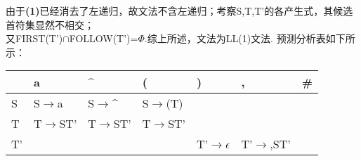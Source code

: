 \documentclass{article}
\begin{document}
由于\textbf{(1)}已经消去了左递归，故文法不含左递归；考察S,T,T'的各产生式，其候选首符集显然不相交；\\
又FIRST(T')$\cap$FOLLOW(T')=$\Phi$.综上所述，文法为LL(1)文法.
预测分析表如下所示：
\begin{table}[h]
    \centering
\begin{tabular}{|p{2cm}<{\centering}|p{2cm}<{\centering}|p{2cm}<{\centering}|p{2cm}<{\centering}|p{2cm}<{\centering}|p{2cm}<{\centering}|p{2cm}<{\centering}|}   
    \hline
    \ & a & $\^{}$ & ( & ) & , & \# \\
    \hline
    S & S$\rightarrow$a & S$\rightarrow\^{}$ & S$\rightarrow$(T) & \ & \ & \ \\
    \hline
    T & T$\rightarrow$ST' & T$\rightarrow$ST' & T$\rightarrow$ST' & & & \\
    \hline
    T' & & & & T'$\rightarrow\epsilon$& T'$\rightarrow$,ST' & \\
    \hline
\end{tabular}
\end{table}
\\ \\
\end{document}
